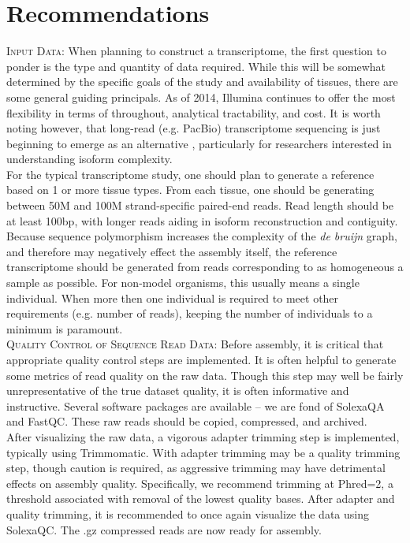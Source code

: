 \section*{Recommendations}

\textsc{Input Data}: When planning to construct a transcriptome, the first question to ponder is the type and quantity of data required. While this will be somewhat determined by the specific goals of the study and availability of tissues, there are some general guiding principals. As of 2014, Illumina continues to offer the most flexibility in terms of throughout, analytical tractability, and cost. It is worth noting however, that long-read (e.g. PacBio) transcriptome sequencing is just beginning to emerge as an alternative \citep{Au:2013hp}, particularly for researchers interested in understanding isoform complexity. \\

For the typical transcriptome study, one should plan to generate a reference based on 1 or more tissue types. From each tissue, one should be generating between 50M and 100M strand-specific paired-end reads. Read length should be at least 100bp, with longer reads aiding in isoform reconstruction and contiguity. Because sequence polymorphism increases the complexity of the \textit{de bruijn} graph, and therefore may negatively effect the assembly itself, the reference transcriptome should be generated from reads corresponding to as homogeneous a sample as possible. For non-model organisms, this usually means a single individual. When more then one individual is required to meet other requirements (e.g. number of reads), keeping the number of individuals to a minimum is paramount. \\

\textsc{Quality Control of Sequence Read Data}: Before assembly, it is critical that appropriate quality control steps are implemented. It is often helpful to generate some metrics of read quality on the raw data. Though this step may well be fairly unrepresentative of the true dataset quality, it is often informative and instructive. Several software packages are available -- we are fond of SolexaQA and FastQC. These raw reads should be copied, compressed, and archived. \\

After visualizing the raw data, a vigorous adapter trimming step is implemented, typically using Trimmomatic. With adapter trimming may be a quality trimming step, though caution is required, as aggressive trimming may have detrimental effects on assembly quality. Specifically, we recommend trimming at Phred=2, a threshold associated with removal of the lowest quality bases. After adapter and quality trimming, it is recommended to once again visualize the data using SolexaQC. The .gz compressed reads are now ready for assembly. \\

